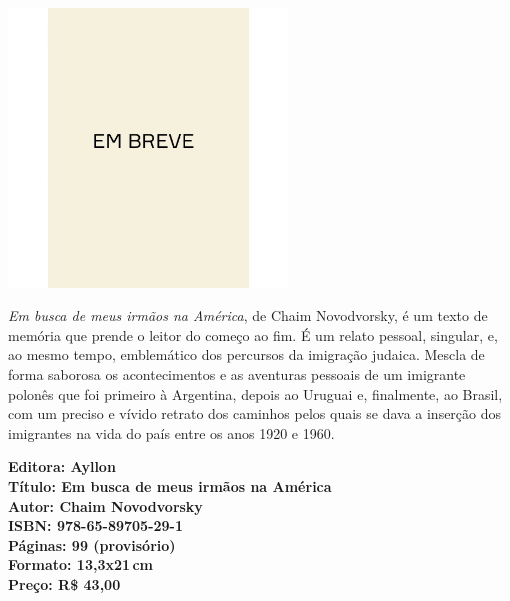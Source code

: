 \begin{center}
\hspace*{.5cm}\includegraphics[width=74mm]{./CAPAS/breve.jpeg}
\end{center}
\hspace*{-7cm}\hrulefill\hspace*{-7cm}
\medskip

\noindent{}\textit{Em busca de meus irmãos na América}, de Chaim Novodvorsky, é um texto de memória que prende o leitor do começo ao fim. É um relato pessoal, singular, e, ao mesmo tempo, emblemático dos percursos da imigração judaica. Mescla de forma saborosa os acontecimentos e as aventuras pessoais de um imigrante polonês que foi primeiro à Argentina, depois ao Uruguai e, finalmente, ao Brasil, com um preciso e vívido retrato dos caminhos pelos quais se dava a inserção dos imigrantes na vida do país entre os anos 1920 e 1960. 

\vfill
\noindent\begin{minipage}[c]{1\linewidth}
{\small\textbf{
\hspace*{-.1cm}Editora: Ayllon\\
Título: Em busca de meus irmãos na América\\
Autor: Chaim Novodvorsky\\ 
ISBN: 978-65-89705-29-1\\
Páginas: 99 (provisório)\\
Formato: 13,3x21\,cm\\
Preço: R\$ 43,00\\
}}
\end{minipage}
\pagebreak

\vspace*{1.5cm}
\bigskip

\hfill{}
\bigskip
\bigskip
\bigskip

\begin{multicols}{2}
\noindent{}\lipsum[2]
\lipsum[4]
\lipsum[6]

{\small\fakereceipt{
\noindent{}\lipsum[7]
}}
\vspace{\baselineskip}

\lipsum[2]
\lipsum[4]
\lipsum[6]

\noindent{}\textcolor{gray}{\footnotesize{}}
\end{multicols}

